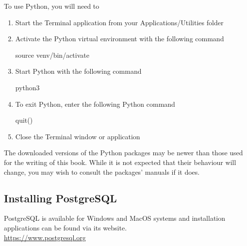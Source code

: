 \begin{itemize}
\begin{alertbox}
To use Python, you will need to 
\begin{enumerate}
\item Start the Terminal application from your Applications/Utilities folder
\item Activate the Python virtual environment with the following command
\begin{bashcode}
source venv/bin/activate
\end{bashcode}
\item Start Python with the following command
\begin{bashcode}
python3
\end{bashcode}
\item To exit Python, enter the following Python command
\begin{pythoncode}
quit()
\end{pythoncode}
\item Close the Terminal window or application
\end{enumerate}
\end{alertbox}

\begin{infobox}
The downloaded versions of the Python packages may be newer than those used for the writing of this book. While it is not expected that their behaviour will change, you may wish to consult the packages' manuals if it does.
\end{infobox}

\end{itemize}
\clearpage
\subsection{Installing PostgreSQL}

\begin{resourcebox}
PostgreSQL is available for Windows and MacOS systems and installation applications can be found via its website. \\

\url{https://www.postgresql.org}
\end{resourcebox}

